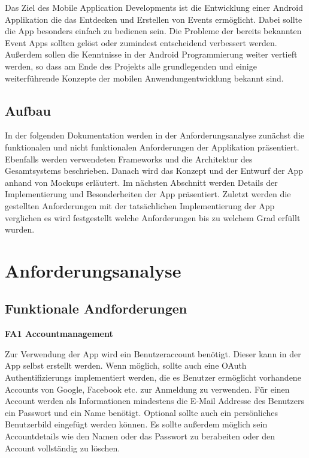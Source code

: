 \documentclass{scrartcl}
\begin{document}
Das Ziel des Mobile Application Developments ist die Entwicklung einer Android
Applikation die das Entdecken und Erstellen von Events ermöglicht. Dabei sollte
die App besonders einfach zu bedienen sein. Die Probleme der bereits bekannten
Event Apps sollten gelöst oder zumindest entscheidend verbessert werden.
Außerdem sollen die Kenntnisse in der Android Programmierung weiter vertieft
werden, so dass am Ende des Projekts alle grundlegenden und einige
weiterführende Konzepte der mobilen Anwendungentwicklung bekannt sind.

\subsection{Aufbau}

In der folgenden Dokumentation werden in der Anforderungsanalyse zunächst die
funktionalen und nicht funktionalen Anforderungen der Applikation präsentiert.
Ebenfalls werden verwendeten Frameworks und die Architektur des Gesamtsystems
beschrieben. Danach wird das Konzept und der Entwurf der App anhand von Mockups
erläutert. Im nächsten Abschnitt werden Details der Implementierung und
Besonderheiten der App präsentiert. Zuletzt werden die gestellten Anforderungen
mit der tatsächlichen Implementierung der App verglichen es wird festgestellt
welche Anforderungen bis zu welchem Grad erfüllt wurden.

\newpage

\section{Anforderungsanalyse}

\subsection{Funktionale Andforderungen}

\textbf{FA1 Accountmanagement}

Zur Verwendung der App wird ein Benutzeraccount benötigt. Dieser kann in der App
selbst erstellt werden. Wenn möglich, sollte auch eine OAuth Authentifizierungs
implementiert werden, die es Benutzer ermöglicht vorhandene Accounts von Google,
Facebook etc. zur Anmeldung zu verwenden. Für einen Account werden als
Informationen mindestens die E-Mail Addresse des Benutzers ein Passwort und ein
Name benötigt. Optional sollte auch ein persönliches Benutzerbild eingefügt
werden können. Es sollte außerdem möglich sein Accountdetails wie den Namen oder
das Passwort zu berabeiten oder den Account vollständig zu löschen.
\end{document}

